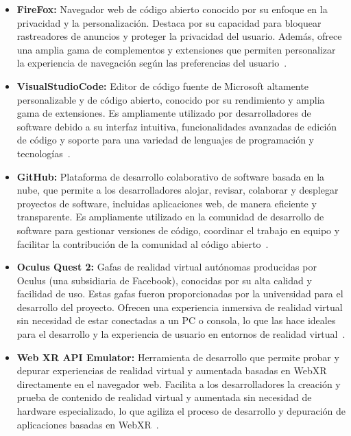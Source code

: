 \documentclass[a4paper, 12pt]{book}
\begin{document}
\begin{itemize}
  \item \textbf{FireFox:} Navegador web de código abierto conocido por su enfoque en la privacidad y la personalización. Destaca por su capacidad 
  para bloquear rastreadores de anuncios y proteger la privacidad del usuario. Además, ofrece una amplia gama de complementos y extensiones que permiten 
  personalizar la experiencia de navegación según las preferencias del usuario~\cite{firefox}.
  
  \item \textbf{VisualStudioCode:} Editor de código fuente de Microsoft altamente personalizable y de código abierto, conocido por su rendimiento y amplia gama 
  de extensiones. Es ampliamente utilizado por desarrolladores de software debido a su interfaz intuitiva, funcionalidades avanzadas de edición de código y soporte 
  para una variedad de lenguajes de programación y tecnologías~\cite{vscode}.
  
  \item \textbf{GitHub:} Plataforma de desarrollo colaborativo de software basada en la nube, que permite a los desarrolladores alojar, revisar, colaborar y desplegar 
  proyectos de software, incluidas aplicaciones web, de manera eficiente y transparente. Es ampliamente utilizado en la comunidad de desarrollo de software para gestionar 
  versiones de código, coordinar el trabajo en equipo y facilitar la contribución de la comunidad al código abierto~\cite{github}.
  
  \item \textbf{Oculus Quest 2:} Gafas de realidad virtual autónomas producidas por Oculus (una subsidiaria de Facebook), conocidas por su alta calidad y facilidad de uso. 
  Estas gafas fueron proporcionadas por la universidad para el desarrollo del proyecto. Ofrecen una experiencia inmersiva de realidad virtual sin necesidad de estar 
  conectadas a un PC o consola, lo que las hace ideales para el desarrollo y la experiencia de usuario en entornos de realidad virtual~\cite{oculus}.
  
  \item \textbf{Web XR API Emulator:} Herramienta de desarrollo que permite probar y depurar experiencias de realidad virtual y aumentada basadas en WebXR directamente 
  en el navegador web. Facilita a los desarrolladores la creación y prueba de contenido de realidad virtual y aumentada sin necesidad de hardware especializado, lo que 
  agiliza el proceso de desarrollo y depuración de aplicaciones basadas en WebXR~\cite{webxrapiemulator}.
  
\end{itemize}
\end{document}
